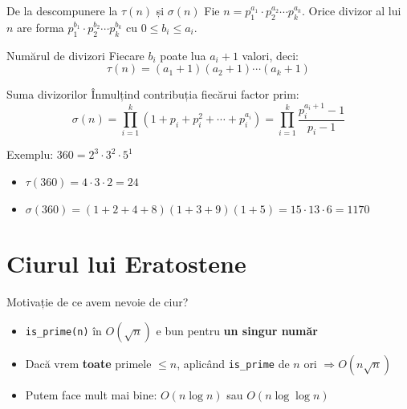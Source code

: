 ﻿\documentclass{beamer}
\begin{document}
\begin{frame}[shrink]{De la descompunere la $\tau(n)$ și $\sigma(n)$}
  Fie $n = p_1^{a_1} \cdot p_2^{a_2} \cdots p_k^{a_k}$. Orice divizor al lui $n$ are forma
  $p_1^{b_1} \cdot p_2^{b_2} \cdots p_k^{b_k}$ cu $0 \leq b_i \leq a_i$.
  \begin{block}{Numărul de divizori}
    Fiecare $b_i$ poate lua $a_i + 1$ valori, deci:
    \[ \tau(n) = (a_1+1)(a_2+1)\cdots(a_k+1) \]
  \end{block}
  \begin{block}{Suma divizorilor}
    Înmulțind contribuția fiecărui factor prim:
    \[ \sigma(n) = \prod_{i=1}^{k}(1 + p_i + p_i^2 + \cdots + p_i^{a_i}) = \prod_{i=1}^{k}\frac{p_i^{a_i+1}-1}{p_i-1} \]
  \end{block}
  Exemplu: $360 = 2^3 \cdot 3^2 \cdot 5^1$
  \begin{itemize}
    \item $\tau(360) = 4 \cdot 3 \cdot 2 = 24$
    \item $\sigma(360) = (1{+}2{+}4{+}8)(1{+}3{+}9)(1{+}5) = 15 \cdot 13 \cdot 6 = 1170$
  \end{itemize}
\end{frame}

\section{Ciurul lui Eratostene}

\begin{frame}{Motivație \textemdash{} de ce avem nevoie de ciur?}
  \begin{itemize}
    \item \texttt{is\_prime(n)} în $O(\sqrt{n})$ e bun pentru \textbf{un singur număr}
    \item Dacă vrem \textbf{toate} primele $\leq n$, aplicând \texttt{is\_prime} de $n$ ori $\Rightarrow O(n\sqrt{n})$
    \item Putem face mult mai bine: $O(n \log n)$ sau $O(n \log \log n)$
  \end{itemize}
\end{frame}
\end{document}
